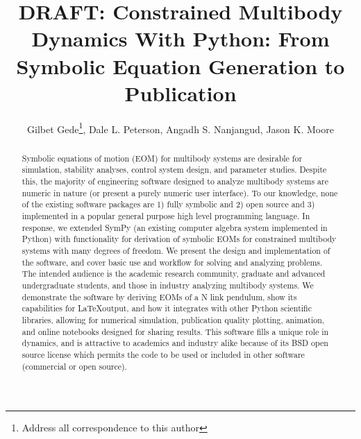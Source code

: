 \documentclass[twocolumn,10pt]{asme2e}
\title{DRAFT: Constrained Multibody Dynamics With Python: From Symbolic
Equation Generation to Publication}
\author{Gilbet Gede\thanks{Address all correspondence to this author}, Dale L.
Peterson, Angadh S. Nanjangud, Jason K. Moore
  \affiliation{
    Sports Biomechanics Laboratory\\
    Department of Mechanical and Aerospace Engineering\\
    University of California\\
    Davis, California 95616\\
    Email: \{ggede, dlpeterson, asnanjangud, jkmoor\}@ucdavis.edu
  }
}
\begin{document}
\maketitle

\begin{abstract}
Symbolic equations of motion (EOM) for multibody systems are desirable for
simulation, stability analyses, control system design, and parameter studies.
Despite this, the majority of engineering software designed to analyze
multibody systems are numeric in nature (or present a purely numeric user
interface). To our knowledge, none of the existing software packages are 1) fully
symbolic and 2) open source and 3) implemented in a popular general purpose
high level programming language.
In response, we extended SymPy (an existing computer algebra system implemented
in Python) with functionality for derivation of symbolic EOMs for constrained
multibody systems with many degrees of freedom.
We present the design and implementation of the software, and cover basic use
and workflow for solving and analyzing problems. The intended audience is the
academic research community, graduate and advanced undergraduate students, and
those in industry analyzing multibody systems.
We demonstrate the software by deriving EOMs of a N link pendulum, show its
capabilities for \LaTeX output, and how it integrates with other Python
scientific libraries, allowing for numerical simulation, publication quality
plotting, animation, and online notebooks designed for sharing results.
This software fills a unique role in dynamics, and is attractive to academics
and industry alike because of its BSD open source license which permits the
code to be used or included in other software (commercial or open source).
\end{abstract}

\end{document}
